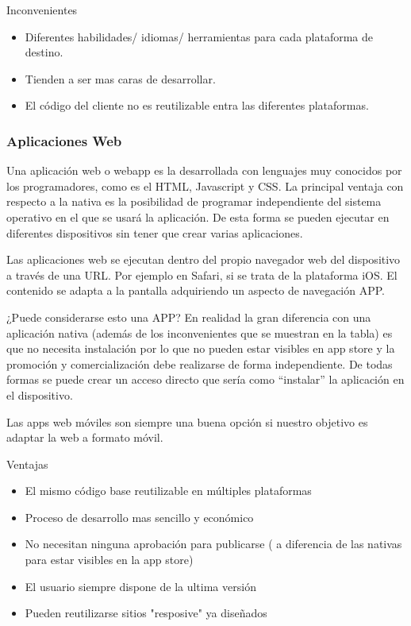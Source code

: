 Inconvenientes

\begin{itemize}

	\item Diferentes habilidades/ idiomas/ herramientas para cada plataforma de destino.

	\item Tienden a ser mas caras de desarrollar. 

	\item El código del cliente no es reutilizable entra las diferentes plataformas.
	
\end{itemize}

\subsubsection{Aplicaciones Web}
\setlength{\parskip}{5mm}
Una aplicación web o webapp es la desarrollada con lenguajes muy conocidos por los programadores, como es el HTML, Javascript y CSS. La principal ventaja con respecto a la nativa es la posibilidad de programar independiente del sistema operativo en el que se usará la aplicación. De esta forma se pueden ejecutar en diferentes dispositivos sin tener que crear varias aplicaciones.

Las aplicaciones web se ejecutan dentro del propio navegador web del dispositivo a través de una URL. Por ejemplo en Safari, si se trata de la plataforma iOS. El contenido se adapta a la pantalla adquiriendo un aspecto de navegación APP.

¿Puede considerarse esto una APP? En realidad la gran diferencia con una aplicación nativa (además de los inconvenientes que se muestran en la tabla) es que no necesita instalación por lo que no pueden estar visibles en app store y la promoción y comercialización debe realizarse de forma independiente. De todas formas se puede crear un acceso directo que sería como “instalar” la aplicación en el dispositivo.

Las apps web móviles son siempre una buena opción si nuestro objetivo es adaptar la web a formato móvil.

Ventajas
\setlength{\parskip}{0mm}
\begin{itemize}

	\item El mismo código base reutilizable en múltiples plataformas 
	
	\item Proceso de desarrollo mas sencillo y económico 
	
	\item No necesitan ninguna aprobación para publicarse ( a diferencia de las nativas para estar visibles en la app store)
	
	\item El usuario siempre dispone de la ultima versión 
	
	\item Pueden reutilizarse sitios "resposive" ya diseñados
	
\end{itemize}

